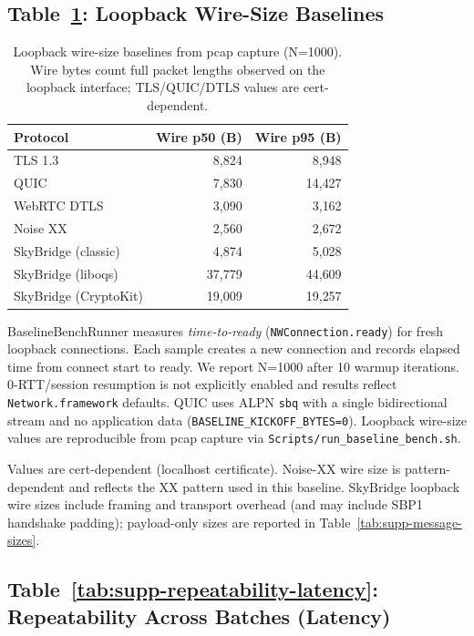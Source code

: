 \documentclass[10pt,journal,compsoc]{IEEEtran}
\begin{document}
\subsection*{Table~\ref{tab:supp-loopback-wire}: Loopback Wire-Size Baselines}

\begin{table}[!tp]
\centering
\caption{Loopback wire-size baselines from pcap capture (N=1000). Wire bytes count full packet lengths observed on the loopback interface; TLS/QUIC/DTLS values are cert-dependent.}
\label{tab:supp-loopback-wire}
\begin{tabular}{@{}lrr@{}}
\toprule
Protocol & Wire p50 (B) & Wire p95 (B) \\
\midrule
TLS 1.3 & 8{,}824 & 8{,}948 \\
QUIC & 7{,}830 & 14{,}427 \\
WebRTC DTLS & 3{,}090 & 3{,}162 \\
Noise XX & 2{,}560 & 2{,}672 \\
SkyBridge (classic) & 4{,}874 & 5{,}028 \\
SkyBridge (liboqs) & 37{,}779 & 44{,}609 \\
SkyBridge (CryptoKit) & 19{,}009 & 19{,}257 \\
\bottomrule
\end{tabular}
\end{table}

BaselineBenchRunner measures \emph{time-to-ready}
(\texttt{NWConnection.ready}) for fresh loopback connections. Each sample
creates a new connection and records elapsed time from connect start to
ready. We report N=1000 after 10 warmup iterations. 0-RTT/session
resumption is not explicitly enabled and results reflect
\texttt{Network.framework} defaults. QUIC uses ALPN \texttt{sbq} with a
single bidirectional stream and no application data
(\texttt{BASELINE\_KICKOFF\_BYTES=0}). Loopback wire-size values are
reproducible from pcap capture via
\texttt{Scripts/\allowbreak run\_\allowbreak baseline\_\allowbreak bench.sh}.

Values are cert-dependent (localhost certificate). Noise-XX wire size is
pattern-dependent and reflects the XX pattern used in this baseline.
SkyBridge loopback wire sizes include framing and transport overhead (and may include SBP1 handshake padding);
payload-only sizes are reported in Table~\ref{tab:supp-message-sizes}.

\subsection*{Table~\ref{tab:supp-repeatability-latency}: Repeatability Across Batches (Latency)}
\end{document}
